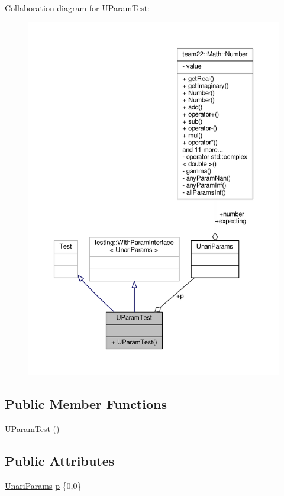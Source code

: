 Collaboration diagram for U\+Param\+Test\+:
\nopagebreak
\begin{figure}[H]
\begin{center}
\leavevmode
\includegraphics[width=350pt]{struct_u_param_test__coll__graph}
\end{center}
\end{figure}
\subsection*{Public Member Functions}
\begin{DoxyCompactItemize}
\item 
\hyperlink{struct_u_param_test_a4460d7e228030b3a5b6bd35cd59656be}{U\+Param\+Test} ()
\end{DoxyCompactItemize}
\subsection*{Public Attributes}
\begin{DoxyCompactItemize}
\item 
\hyperlink{struct_unari_params}{Unari\+Params} \hyperlink{struct_u_param_test_ab8f85343a35eded9f31b05a7869608c9}{p} \{0,0\}
\end{DoxyCompactItemize}


